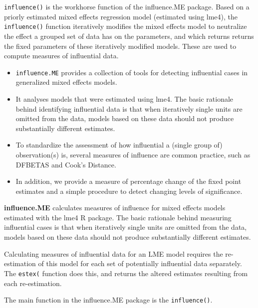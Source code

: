 \documentclass[12pt, a4paper]{report}
\begin{document}
	\texttt{influence()} is the workhorse function of the influence.ME package. Based on a priorly estimated mixed effects regression model (estimated using lme4), the \texttt{influence()} function iteratively modifies the mixed effects model to neutralize the effect a grouped set of data has on the parameters, and which returns returns the fixed parameters of these iteratively modified models. These are used to compute measures of influential data.
	
	
\begin{itemize}
	\item \texttt{influence.ME} provides a collection of tools for
	detecting influential cases in generalized mixed effects
	models. 
	
	\item It analyses models that were estimated using lme4. The
	basic rationale behind identifying influential data is that
	when iteratively single units are omitted from the data, models
	based on these data should not produce substantially different
	estimates. 
	
	\item To standardize the assessment of how influential a
	(single group of) observation(s) is, several measures of
	influence are common practice, such as DFBETAS and Cook's Distance.
	
	\item In addition, we provide a measure of percentage change of the fixed point
	estimates and a simple procedure to detect changing levels of significance.
\end{itemize}

\textbf{influence.ME} calculates measures of influence for mixed effects models estimated with the lme4 R package. The
basic rationale behind measuring influential cases is that when iteratively single units are omitted
from the data, models based on these data should not produce substantially different estimates. 

Calculating measures of influential data for an LME model requires the re-estimation
of this model for each set of potentially influential data separately. The \texttt{estex(} function does this,
and returns the altered estimates resulting from each re-estimation. 

The main function in the influence.ME package is the \texttt{influence()}.
\end{document}
